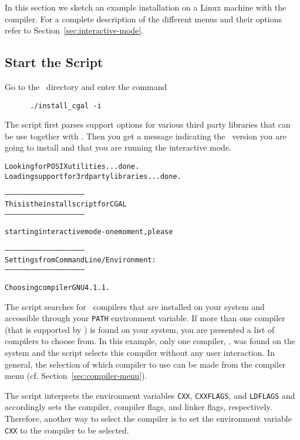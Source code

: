 In this section we sketch an example installation on a Linux machine
with the  compiler. For a complete description of the
different menus and their options refer to
Section~\ref{sec:interactive-mode}.

\subsection{Start the Script}

Go to the \cgaldir\ directory and enter the command
\begin{verbatim}
      ./install_cgal -i
\end{verbatim}

The script first parses support options for various third party
libraries that can be use together with \cgal. Then you get a message
indicating the \cgal\ version you are going to install and that you
are running the interactive mode.

{\ccTexHtml{\scriptsize}{}
\begin{alltt}
Looking for POSIX utilities... done.
Loading support for 3rd party libraries...done.

--------------------------------------------------------
  This is the install script for CGAL \cgalrelease
--------------------------------------------------------

starting interactive mode - one moment, please

--------------------------------------------------------
Settings from Command Line/Environment:
--------------------------------------------------------

  Choosing compiler GNU 4.1.1.
\end{alltt}}

The script searches for \CC\ compilers that are installed on your
system and accessible through your \texttt{PATH} environment variable.
If more than one compiler (that is supported by \cgal) is found on
your system, you are presented a list of compilers to choose from. In
this example, only one compiler, , was found on the system
and the script selects this compiler without any user interaction. In
general, the selection of which compiler to use can be made from the
compiler menu (cf. Section~\ref{sec:compiler-menu}).

The script interprets the environment variables \texttt{CXX},
\texttt{CXXFLAGS}, and \texttt{LDFLAGS} and accordingly sets the
compiler, compiler flags, and linker flags, respectively.  Therefore,
another way to select the compiler is to set the environment variable
\texttt{CXX} to the compiler to be selected.


